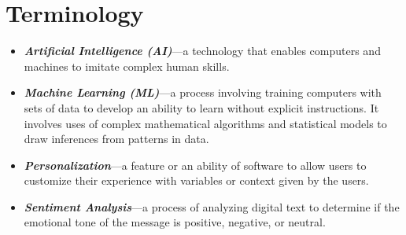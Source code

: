 \section{Terminology}
\label{section:terminology}

\begin{itemize}[leftmargin=40pt]
    \item \textbf{\textit{Artificial Intelligence (AI)}}---a technology that enables computers and machines to imitate complex human skills.
    \item \textbf{\textit{Machine Learning (ML)}}---a process involving training computers with sets of data to develop an ability to learn without explicit instructions. It involves uses of complex mathematical algorithms and statistical models to draw inferences from patterns in data.
    \item \textbf{\textit{Personalization}}---a feature or an ability of software to allow users to customize their experience with variables or context given by the users.
    \item \textbf{\textit{Sentiment Analysis}}---a process of analyzing digital text to determine if the emotional tone of the message is positive, negative, or neutral.
\end{itemize}